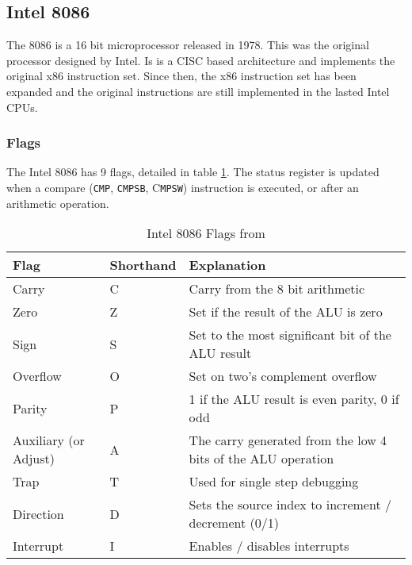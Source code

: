 \documentclass[12pt,a4paper]{article}
\begin{document}
\begin{bibunit}[is-unsrt]
\subsection{Intel 8086}

The 8086 is a 16 bit microprocessor released in 1978.
This was the original processor designed by Intel.
Is is a CISC based architecture and implements the original x86 instruction set.
Since then, the x86 instruction set has been expanded and the original instructions are still implemented in the lasted Intel CPUs.

\subsubsection{Flags}

The Intel 8086 has 9 flags, detailed in table \ref{tab:Intel:flags}.
The status register is updated when a compare (\texttt{CMP}, \texttt{CMPSB}, C\texttt{MPSW}) instruction is executed, or after an arithmetic operation.

\begin{table}
\centering
\caption{Intel 8086 Flags from \cite{Intel:flags}}
\label{tab:Intel:flags}
\begin{tabular}{p{}p{}p{}}\hline
Flag & Shorthand & Explanation \\ \hline
Carry & C & Carry from the 8 bit arithmetic \\
Zero & Z & Set if the result of the ALU is zero \\
Sign & S & Set to the most significant bit of the ALU result \\
Overflow & O & Set on two's complement overflow \\
Parity & P & 1 if the ALU result is even parity, 0 if odd \cite{flag:p} \\
Auxiliary (or Adjust) & A & The carry generated from the low 4 bits of the ALU operation \cite{flag:a}\\
Trap & T & Used for single step debugging \cite{flag:t} \\
Direction & D & Sets the source index to increment / decrement (0/1) \cite{flag:d} \\
Interrupt & I & Enables / disables interrupts \cite{flag:i} \\
\end{tabular}
\end{table}


\end{bibunit}
\end{document}
